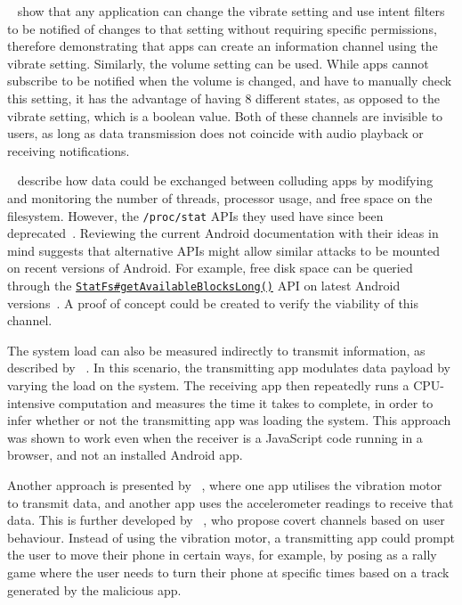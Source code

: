 \documentclass[article]{aaltoseries}
\begin{document}
\citeauthor{Schlegel2011}~\cite{Schlegel2011} show that any application can change the vibrate setting and use intent filters to be notified of changes to that setting without requiring specific permissions, therefore demonstrating that apps can create an information channel using the vibrate setting. Similarly, the volume setting can be used. While apps cannot subscribe to be notified when the volume is changed, and have to manually check this setting, it has the advantage of having 8 different states, as opposed to the vibrate setting, which is a boolean value. Both of these channels are invisible to users, as long as data transmission does not coincide with audio playback or receiving notifications.

\citeauthor{Marforio2012}~\cite{Marforio2012} describe how data could be exchanged between colluding apps by modifying and monitoring the number of threads, processor usage, and free space on the filesystem. However, the \texttt{/proc/stat} APIs they used have since been deprecated~\cite{nn2017}. Reviewing the current Android documentation with their ideas in mind suggests that alternative APIs might allow similar attacks to be mounted on recent versions of Android. For example, free disk space can be queried through the \href{https://developer.android.com/reference/android/os/StatFs.html#getAvailableBlocksLong()}{\texttt{StatFs\#getAvailableBlocksLong()}} API on latest Android versions~\cite{AOSPdeveloper}. A proof of concept could be created to verify the viability of this channel.

The system load can also be measured indirectly to transmit information, as described by \citeauthor{Marforio2012}~\cite{Marforio2012}. In this scenario, the transmitting app modulates data payload by varying the load on the system. The receiving app then repeatedly runs a CPU-intensive computation and measures the time it takes to complete, in order to infer whether or not the transmitting app was loading the system. This approach was shown to work even when the receiver is a JavaScript code running in a browser, and not an installed Android app.

Another approach is presented by \citeauthor{Al-Haiqi2014}~\cite{Al-Haiqi2014}, where one app utilises the vibration motor to transmit data, and another app uses the accelerometer readings to receive that data. This is further developed by \citeauthor{Qi2018}~\cite{Qi2018}, who propose covert channels based on user behaviour. Instead of using the vibration motor, a transmitting app could prompt the user to move their phone in certain ways, for example, by posing as a rally game where the user needs to turn their phone at specific times based on a track generated by the malicious app.
\end{document}
